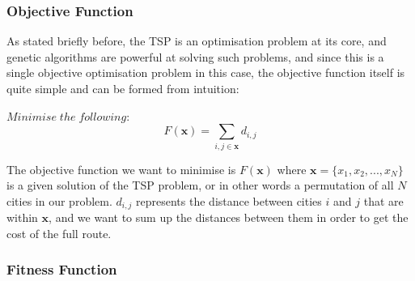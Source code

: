 \documentclass[11pt,a4paper,titlepage]{article}
\begin{document}
\subsubsection{Objective Function}

As stated briefly before, the TSP is an optimisation problem at its core, and genetic algorithms are powerful at solving such problems, and since this is a single objective optimisation problem in this case, the objective function itself is quite simple and can be formed from intuition:


$Minimise\; the\; following:$ \[F(\mathbf{x}) = \sum_{i,j \in \mathbf{x}} d_{i,j} \]

The objective function we want to minimise is $F(\mathbf{x})$ where $\mathbf{x} = \{x_1, x_2, ..., x_N\}$ is a given solution of the TSP problem, or in other words a permutation of all $N$ cities in our problem. $d_{i,j}$ represents the distance between cities $i$ and $j$ that are within $\mathbf{x}$, and we want to sum up the distances between them in order to get the cost of the full route.

\subsubsection{Fitness Function}
\end{document}
